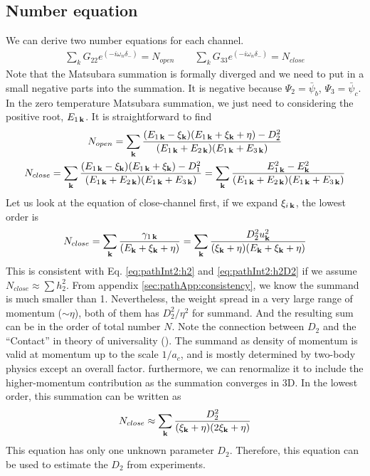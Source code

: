\subsection{Number equation}
We can derive two number equations for each channel.  
\begin{gather*}
\sum_{k}G_{22}e^{(-i\omega_n\delta_-)}=N_{open}\qquad
\sum_{k}G_{33}e^{(-i\omega_n\delta_-)}=N_{close}
\end{gather*}
Note that the Matsubara summation is formally diverged and we need to put in a small negative parts into the summation.  It is negative because $\Psi_2=\bar\psi_b$, $\Psi_3=\bar\psi_c$.  In the zero temperature Matsubara summation, we just need to considering the positive root, $E_{1\,\mathbf{k}}$.  It is straightforward to find 
\begin{gather}
N_{open}=\sum_{\mathbf{k}}\frac{(E_{1\,\mathbf{k}}-\xi_{\mathbf{k}})(E_{1\,\mathbf{k}}+\xi_{\mathbf{k}}+\eta)-D_2^2}{(E_{1\,\mathbf{k}}+E_{2\,\mathbf{k}})(E_{1\,\mathbf{k}}+E_{3\,\mathbf{k}})}\\
N_{close}=\sum_{\mathbf{k}}\frac{(E_{1\,\mathbf{k}}-\xi_{\mathbf{k}})(E_{1\,\mathbf{k}}+\xi_{\mathbf{k}})-D_1^2}{(E_{1\,\mathbf{k}}+E_{2\,\mathbf{k}})(E_{1\,\mathbf{k}}+E_{3\,\mathbf{k}})}
=\sum_{\mathbf{k}}\frac{E_{1\,\mathbf{k}}^2-E_{\mathbf{k}}^2}{(E_{1\,\mathbf{k}}+E_{2\,\mathbf{k}})(E_{1\,\mathbf{k}}+E_{3\,\mathbf{k}})}\label{eq:pathInt2:numClose}
\end{gather}
Let us look at the equation of close-channel first, if we expand $\xi_{i\,\mathbf{k}}$, the lowest order is 
\begin{equation}
N_{close}=\sum_{\mathbf{k}}\frac{\gamma_{1\,\mathbf{k}}}{(E_{\mathbf{k}}+\xi_{\mathbf{k}}+\eta)}=\sum_{\mathbf{k}}\frac{D_{2}^2u_{\mathbf{k}}^{2}}{(\xi_{\mathbf{k}}+\eta)(E_{\mathbf{k}}+\xi_{\mathbf{k}}+\eta)}
\end{equation}
This is consistent with Eq. \ref{eq:pathInt2:h2} and \ref{eq:pathInt2:h2D2} if we assume $N_{close}\approx\sum{h_{2}^{2}}$.  From appendix \ref{sec:pathApp:consistency}, we know the summand is much smaller than 1.  Nevertheless, the weight spread in a very large range of momentum ($\sim\eta$),  both of them has $D_{2}^{2}/\eta^{2}$ for summand. And the resulting sum can be in the order of total number $N$. Note the connection between $D_{2}$ and the ``Contact'' in theory of universality (\cite{Tan2008-1,Tan2008-2}).  The summand as  density of momentum is valid at momentum up to the scale $1/a_{c}$, and is mostly determined by two-body physics except an overall factor.  furthermore, we can renormalize it to include the higher-momentum contribution as the summation converges in 3D.  In the lowest order, this summation can be written as 
\begin{equation}
N_{close}\approx\sum_{\mathbf{k}}\frac{D_{2}^2}{(\xi_{\mathbf{k}}+\eta)(2\xi_{\mathbf{k}}+\eta)}
\end{equation}
This equation has only one unknown parameter $D_{2}$.  Therefore, this equation can be used to estimate the $D_{2}$ from experiments.  

